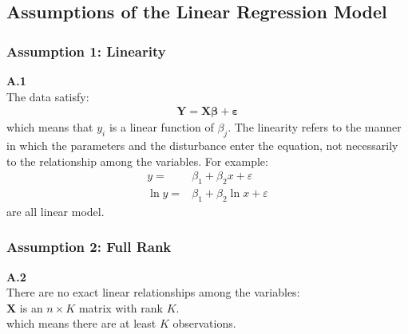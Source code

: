 \documentclass{article}
\begin{document}
\subsection{Assumptions of the Linear Regression Model}
\subsubsection{Assumption 1: Linearity}
\textbf{A.1}\\ 
The data satisfy:
	\begin{align*}
		\boldsymbol{Y} = \boldsymbol{X}\boldsymbol{\beta} + \boldsymbol{\varepsilon}
	\end{align*}
which means that $y_i$ is a linear function of $\beta_j$. The linearity refers to the manner in which the parameters and the disturbance enter the equation, not necessarily to the relationship among the variables. For example:
	\begin{align*}
		y = &\beta_1 + \beta_2 x + \varepsilon\\
		\ln y = &\beta_1 + \beta_2 \ln x + \varepsilon
	\end{align*}
are all linear model.

\subsubsection{Assumption 2: Full Rank}
\textbf{A.2}\\ 
There are no exact linear relationships among the variables:\\
\indent $\boldsymbol{X}$ is an $n \times K$ matrix with rank $K$.\\
which means there are at least $K$ observations.
\end{document}
